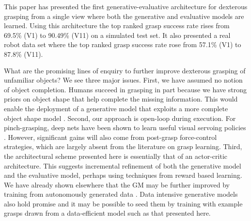 This paper has presented the first generative-evaluative architecture for dexterous grasping from a single view where both the generative and evaluative models are learned. Using this architecture the top ranked grasp success rate rises from 69.5\% (V1) to 90.49\% (V11) on a simulated test set. It also presented a real robot data set where the top ranked grasp success rate rose from 57.1\% (V1) to 87.8\% (V11).

What are the promising lines of enquiry to further improve dexterous grasping of unfamiliar objects? We see three major issues. First, we have assumed no notion of object completion. Humans succeed in grasping in part because we have strong priors on object shape that help complete the missing information. This would enable the deployment of a generative model that exploits a more complete object shape model \cite{kopicki2015ijrr}. Second, our approach is open-loop during execution. For pinch-grasping, deep nets have been shown to learn useful visual servoing policies \cite{morrison18}. However, significant gains will also come from post-grasp force-control strategies, which are largely absent from the literature on grasp learning.  Third, the architectural scheme presented here is essentially that of an actor-critic architecture. This suggests incremental refinement of both the generative model and the evaluative model, perhaps using techniques from reward based learning. We have already shown elsewhere that the GM may be further improved by training from autonomously generated data \cite{kopicki2019ijrr}. Data intensive generative models also hold promise \cite{veres2017modeling} and it may be possible to seed them by training with example grasps drawn from a data-efficient model such as that presented here.\\
